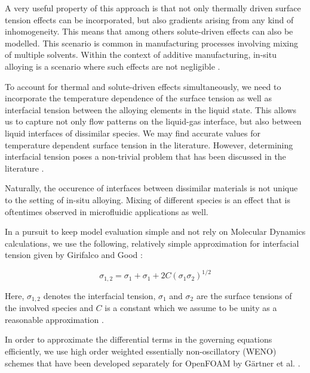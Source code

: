 \documentclass[conference,final]{IEEEtran}
\begin{document}
A very useful property of this approach is that not only thermally driven surface tension effects can be incorporated, but also gradients arising from any kind of inhomogeneity. This means that among others solute-driven effects can also be modelled. This scenario is common in manufacturing processes involving mixing of multiple solvents. Within the context of additive manufacturing, in-situ alloying is a scenario where such effects are not negligible \cite{katz-demyanetzInsituAlloyingNovel2020}.

To account for thermal and solute-driven effects simultaneously, we need to incorporate the temperature dependence of the surface tension as well as interfacial tension between the alloying elements in the liquid state. This allows us to capture not only flow patterns on the liquid-gas interface, but also between liquid interfaces of dissimilar species. We may find accurate values for temperature dependent surface tension in the literature. However, determining interfacial tension poses a non-trivial problem that has been discussed in the literature \cite{marmurCorrelatingInterfacialTensions2010}.

Naturally, the occurence of interfaces between dissimilar materials is not unique to the setting of in-situ alloying. Mixing of different species is an effect that is oftentimes observed in microfluidic applications as well.

In a pursuit to keep model evaluation simple and not rely on Molecular Dynamics calculations, we use the following, relatively simple approximation for interfacial tension given by Girifalco and Good \cite{girifalcoTheoryEstimationSurface1957}:

\begin{equation}
    \sigma_{1,2} = \sigma_1 + \sigma_1 + 2C (\sigma_1 \sigma_2)^{1/2}
\end{equation}

Here, $\sigma_{1,2}$ denotes the interfacial tension, $\sigma_1$ and $\sigma_2$ are the surface tensions of the involved species and $C$ is a constant which we assume to be unity as a reasonable approximation \cite{marmurCorrelatingInterfacialTensions2010}.

In order to approximate the differential terms in the governing equations efficiently, we use high order weighted essentially non-oscillatory (WENO) schemes that have been developed separately for OpenFOAM by Gärtner et al. \cite{gartnerEfficientWENOLibrary2020,martinImplementationValidationSemiImplicit2018}.
\end{document}
